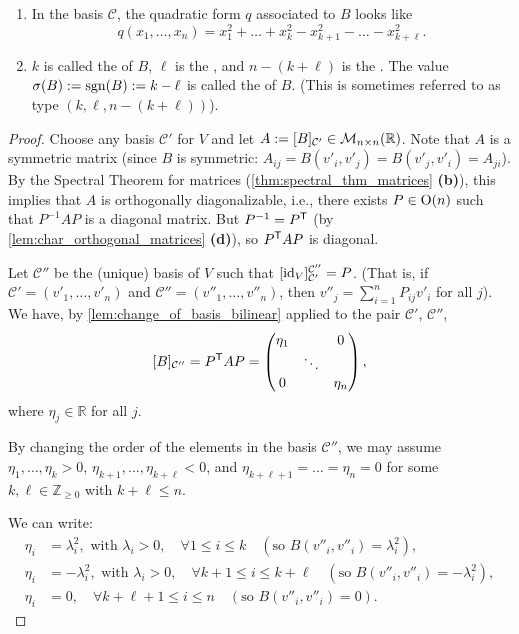 \begin{remark}
\leavevmode
\begin{enumerate}[label=\textbf{(\alph*)}]
    \item In the basis $\mathcal{C}$, the quadratic form $q$ associated to $B$ looks like 
    \[ q(x_1, \dots, x_n) = x_1^2 + \dots + x_k^2 - x_{k+1}^2 - \dots - x_{k+\ell}^2. \]
    \item $k$ is called the  of $B$, $\ell$ is the , and $n - (k + \ell)$ is the . The value $\sigma(B) := \operatorname{sgn}(B) := k - \ell$ is called the  of $B$. (This is sometimes referred to as type $(k, \ell, n - (k + \ell))$).
\end{enumerate}
\end{remark}

\begin{proof}
Choose any basis $\mathcal{C}'$ for $V$ and let $A := [B]_{\mathcal{C}'} \in \mathcal{M}_{n \times n}(\mathbb{R})$. Note that $A$ is a symmetric matrix (since $B$ is symmetric: $A_{ij} = B(v'_i, v'_j) = B(v'_j, v'_i) = A_{ji}$). By the Spectral Theorem for matrices (\cref{thm:spectral_thm_matrices} \textbf{(b)}), this implies that $A$ is orthogonally diagonalizable, i.e., there exists $P \in \operatorname{O}(n)$ such that $P^{-1} A P$ is a diagonal matrix. But $P^{-1} = P^{\mathsf{T}}$ (by \cref{lem:char_orthogonal_matrices} \textbf{(d)}), so $P^{\mathsf{T}} A P$ is diagonal.

Let $\mathcal{C}''$ be the (unique) basis of $V$ such that $[\operatorname{id}_V]_{\mathcal{C}'}^{\mathcal{C}''} = P$. (That is, if $\mathcal{C}' = (v'_1, \dots, v'_n)$ and $\mathcal{C}'' = (v''_1, \dots, v''_n)$, then $v''_j = \sum_{i=1}^n P_{ij} v'_i$ for all $j$).
We have, by \cref{lem:change_of_basis_bilinear} applied to the pair $\mathcal{C}'$, $\mathcal{C}''$,
\[
[B]_{\mathcal{C}''} = P^{\mathsf{T}} A P = \begin{pmatrix} \eta_1 & & 0 \\ & \ddots & \\ 0 & & \eta_n \end{pmatrix},
\]
where $\eta_j \in \mathbb{R}$ for all $j$.

By changing the order of the elements in the basis $\mathcal{C}''$, we may assume $\eta_1, \dots, \eta_k > 0$, $\eta_{k+1}, \dots, \eta_{k+\ell} < 0$, and $\eta_{k+\ell+1} = \dots = \eta_n = 0$ for some $k, \ell \in \mathbb{Z}_{\ge 0}$ with $k + \ell \le n$.

We can write:
\begin{align*}
\eta_i &= \lambda_i^2, \text{ with } \lambda_i > 0, \quad \forall 1 \le i \le k \quad (\text{so } B(v''_i, v''_i) = \lambda_i^2), \\
\eta_i &= -\lambda_i^2, \text{ with } \lambda_i > 0, \quad \forall k+1 \le i \le k+\ell \quad (\text{so } B(v''_i, v''_i) = -\lambda_i^2), \\
\eta_i &= 0, \quad \forall k+\ell+1 \le i \le n \quad (\text{so } B(v''_i, v''_i) = 0).
\end{align*}


\end{proof}
